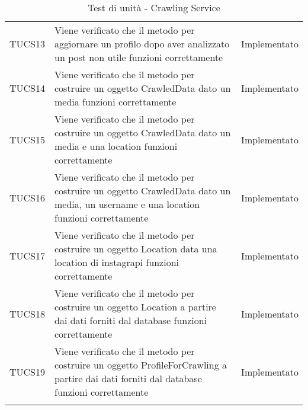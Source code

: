 \begin{longtable}{ m{}<{\centering}  m{}<{\centering}  m{}<{\centering} }
    TUCS13 & Viene verificato che il metodo per aggiornare un profilo dopo aver analizzato un post non utile funzioni correttamente & Implementato \\
    TUCS14 & Viene verificato che il metodo per costruire un oggetto CrawledData dato un media funzioni correttamente & Implementato \\
    TUCS15 & Viene verificato che il metodo per costruire un oggetto CrawledData dato un media e una location funzioni correttamente & Implementato \\
    TUCS16 & Viene verificato che il metodo per costruire un oggetto CrawledData dato un media, un username e una location funzioni correttamente & Implementato \\
    TUCS17 & Viene verificato che il metodo per costruire un oggetto Location data una location di instagrapi funzioni correttamente & Implementato \\
    TUCS18 & Viene verificato che il metodo per costruire un oggetto Location a partire dai dati forniti dal database funzioni correttamente & Implementato \\
    TUCS19 & Viene verificato che il metodo per costruire un oggetto ProfileForCrawling a partire dai dati forniti dal database funzioni correttamente & Implementato \\
    \caption{Test di unità - Crawling Service}
\end{longtable}	


